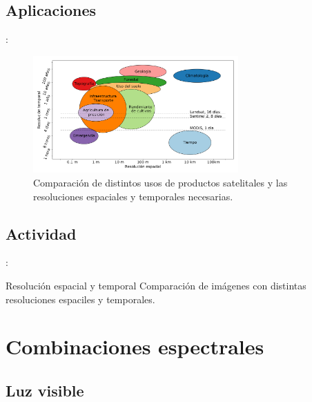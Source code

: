 \documentclass[handout,aspectratio=169]{beamer}
\begin{document}
\subsection{Aplicaciones}

\begin{frame}{\secname : \subsecname}
    \begin{figure}[h!]
        \centering
        \includegraphics[width=0.7\textwidth]{fig:evst.png}
        \caption{Comparación de distintos usos de productos satelitales y las resoluciones espaciales y temporales necesarias.}
        \label{fig:evst}
    \end{figure}
\end{frame}

\subsection{Actividad}

\begin{frame}{\secname : \subsecname}
    \begin{alertblock}{Resolución espacial y temporal}
        Comparación de imágenes con distintas resoluciones espaciles y temporales.
    \end{alertblock}
\end{frame}


\section{Combinaciones espectrales}
\subsection{Luz visible}
\end{document}
